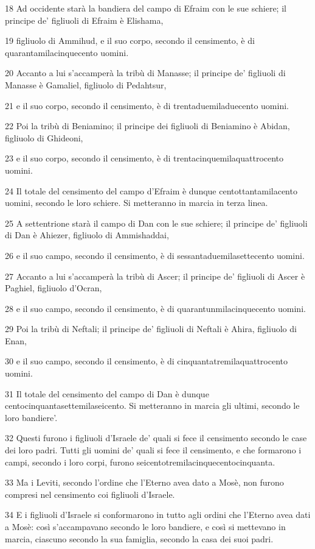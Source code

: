 \par 18 Ad occidente starà la bandiera del campo di Efraim con le sue schiere; il principe de' figliuoli di Efraim è Elishama,
\par 19 figliuolo di Ammihud, e il suo corpo, secondo il censimento, è di quarantamilacinquecento uomini.
\par 20 Accanto a lui s'accamperà la tribù di Manasse; il principe de' figliuoli di Manasse è Gamaliel, figliuolo di Pedahtsur,
\par 21 e il suo corpo, secondo il censimento, è di trentaduemiladuecento uomini.
\par 22 Poi la tribù di Beniamino; il principe dei figliuoli di Beniamino è Abidan, figliuolo di Ghideoni,
\par 23 e il suo corpo, secondo il censimento, è di trentacinquemilaquattrocento uomini.
\par 24 Il totale del censimento del campo d'Efraim è dunque centottantamilacento uomini, secondo le loro schiere. Si metteranno in marcia in terza linea.
\par 25 A settentrione starà il campo di Dan con le sue schiere; il principe de' figliuoli di Dan è Ahiezer, figliuolo di Ammishaddai,
\par 26 e il suo campo, secondo il censimento, è di sessantaduemilasettecento uomini.
\par 27 Accanto a lui s'accamperà la tribù di Ascer; il principe de' figliuoli di Ascer è Paghiel, figliuolo d'Ocran,
\par 28 e il suo campo, secondo il censimento, è di quarantunmilacinquecento uomini.
\par 29 Poi la tribù di Neftali; il principe de' figliuoli di Neftali è Ahira, figliuolo di Enan,
\par 30 e il suo campo, secondo il censimento, è di cinquantatremilaquattrocento uomini.
\par 31 Il totale del censimento del campo di Dan è dunque centocinquantasettemilaseicento. Si metteranno in marcia gli ultimi, secondo le loro bandiere'.
\par 32 Questi furono i figliuoli d'Israele de' quali si fece il censimento secondo le case dei loro padri. Tutti gli uomini de' quali si fece il censimento, e che formarono i campi, secondo i loro corpi, furono seicentotremilacinquecentocinquanta.
\par 33 Ma i Leviti, secondo l'ordine che l'Eterno avea dato a Mosè, non furono compresi nel censimento coi figliuoli d'Israele.
\par 34 E i figliuoli d'Israele si conformarono in tutto agli ordini che l'Eterno avea dati a Mosè: così s'accampavano secondo le loro bandiere, e così si mettevano in marcia, ciascuno secondo la sua famiglia, secondo la casa dei suoi padri.

